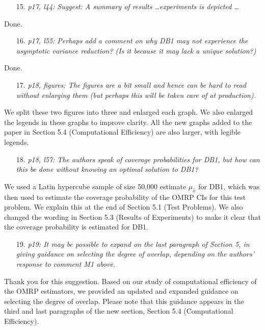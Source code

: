 \documentclass[11pt,notitlepage,onecolumn]{article}
\begin{document}
\begin{itemize}
\item[15.] \textit{p17, l44: Suggest: A summary of results \ldots experiments is depicted \ldots}
\end{itemize}

\noindent Done.
\medskip 


\begin{itemize}
\item[16.] \textit{p17, l55: Perhaps add a comment on why DB1 may not experience the asymptotic variance reduction? 
(Is it because it may lack a unique solution?)}
\end{itemize}

\noindent
Done.
\medskip 


\begin{itemize}
\item[17.] \textit{p18, figures: The figures are a bit small and hence can be hard to read without enlarging them (but perhaps this will be taken care of at production).}
\end{itemize}

\noindent 
We split these two figures into three and enlarged each graph. 
We also enlarged the legends in these graphs to improve clarity.
All the new graphs added to the paper in Section 5.4 (Computational Efficiency) are also larger, with legible legends. 
\medskip 


\begin{itemize}
\item[18.] \textit{p18, l57: The authors speak of coverage probabilities for DB1, but how can this be done without knowing an optimal solution to DB1?}
\end{itemize}

\noindent 
We used a Latin hypercube sample of size 50,000 estimate $\mu_{\hat{x}}$ for DB1, which was then used to estimate the coverage probability of the OMRP CIs for this test problem.
We explain this at the end of Section 5.1 (Test Problems). 
We also changed the wording in Section 5.3 (Results of Experiments) to make it clear that the coverage probability is estimated for DB1. 
\medskip 


\begin{itemize}
\item[19.] \textit{p19: It may be possible to expand on the last paragraph of Section 5, in giving guidance on selecting the degree of overlap, depending on the authors' response to comment M1 above.}
\end{itemize}

\noindent 
Thank you for this suggestion. 
Based on our study of computational efficiency of the OMRP estimators, we  provided an updated and expanded guidance on selecting the degree of overlap. 
Please note that this guidance appears in the third and last paragraphs of the new section, Section 5.4 (Computational Efficiency). 
\end{document}

